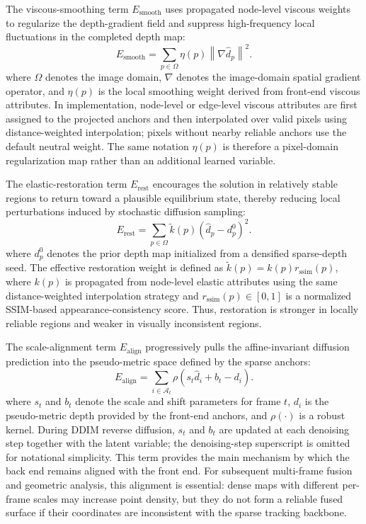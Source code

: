 \documentclass[pdflatex,sn-mathphys-num]{sn-jnl}
\begin{document}
The viscous-smoothing term $E_{\mathrm{smooth}}$ uses propagated node-level viscous weights to regularize the depth-gradient field and suppress high-frequency local fluctuations in the completed depth map:
\begin{equation}
E_{\mathrm{smooth}} = \sum_{p\in\Omega} \eta(p) \left\lVert \nabla \hat d_p \right\rVert^2.
\label{eq:smooth}
\end{equation}
where $\Omega$ denotes the image domain, $\nabla$ denotes the image-domain spatial gradient operator, and $\eta(p)$ is the local smoothing weight derived from front-end viscous attributes. In implementation, node-level or edge-level viscous attributes are first assigned to the projected anchors and then interpolated over valid pixels using distance-weighted interpolation; pixels without nearby reliable anchors use the default neutral weight. The same notation $\eta(p)$ is therefore a pixel-domain regularization map rather than an additional learned variable.

The elastic-restoration term $E_{\mathrm{rest}}$ encourages the solution in relatively stable regions to return toward a plausible equilibrium state, thereby reducing local perturbations induced by stochastic diffusion sampling:
\begin{equation}
E_{\mathrm{rest}} = \sum_{p\in\Omega} \tilde{k}(p) \left(\hat d_p - d_p^0\right)^2.
\label{eq:rest}
\end{equation}
where $d_p^0$ denotes the prior depth map initialized from a densified sparse-depth seed. The effective restoration weight is defined as $\tilde{k}(p)=k(p)r_{\mathrm{ssim}}(p)$, where $k(p)$ is propagated from node-level elastic attributes using the same distance-weighted interpolation strategy and $r_{\mathrm{ssim}}(p)\in[0,1]$ is a normalized SSIM-based appearance-consistency score. Thus, restoration is stronger in locally reliable regions and weaker in visually inconsistent regions.

The scale-alignment term $E_{\mathrm{align}}$ progressively pulls the affine-invariant diffusion prediction into the pseudo-metric space defined by the sparse anchors:
\begin{equation}
E_{\mathrm{align}} = \sum_{i\in\mathcal{A}_t} \rho\!\left(s_t \hat d_i + b_t - d_i\right).
\label{eq:align}
\end{equation}
where $s_t$ and $b_t$ denote the scale and shift parameters for frame $t$, $d_i$ is the pseudo-metric depth provided by the front-end anchors, and $\rho(\cdot)$ is a robust kernel. During DDIM reverse diffusion, $s_t$ and $b_t$ are updated at each denoising step together with the latent variable; the denoising-step superscript is omitted for notational simplicity. This term provides the main mechanism by which the back end remains aligned with the front end. For subsequent multi-frame fusion and geometric analysis, this alignment is essential: dense maps with different per-frame scales may increase point density, but they do not form a reliable fused surface if their coordinates are inconsistent with the sparse tracking backbone.
\end{document}
